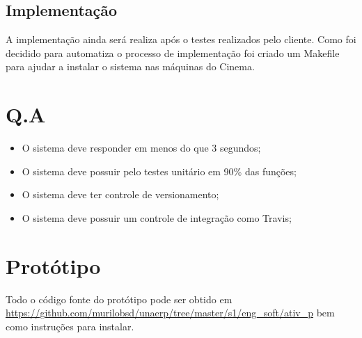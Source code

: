 \documentclass[12pt,a4paper]{article}
\let\oldsection\section
\renewcommand\section{\clearpage\oldsection}
\begin{document}
\subsection{Implementação}
A implementação ainda será realiza após o testes realizados pelo cliente. Como
foi decidido para automatiza o processo de implementação foi criado um Makefile
para ajudar a instalar o sistema nas máquinas do Cinema.


\section{Q.A}
\begin{itemize}
	\item O sistema deve responder em menos do que 3 segundos;
	\item O sistema deve possuir pelo testes unitário em 90\% das funções;
	\item O sistema deve ter controle de versionamento;
	\item O sistema deve possuir um controle de integração como Travis;
\end{itemize}


\section{Protótipo}

Todo o código fonte do protótipo pode ser obtido em \href{https://github.com/murilobsd/unaerp/tree/master/s1/eng\_soft/ativ\_p}{https://github.com/murilobsd/unaerp/tree/master/s1/eng\_soft/ativ\_p} bem como instruções para instalar.
\end{document}
